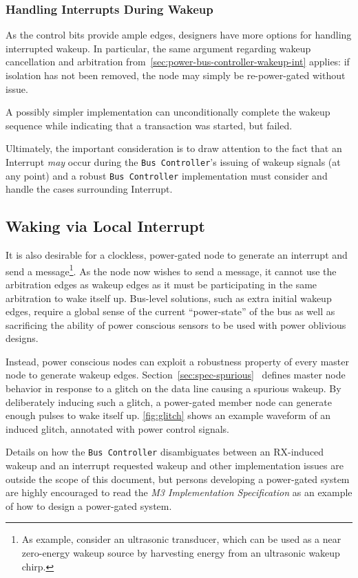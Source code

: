 \subsubsection{Handling Interrupts During Wakeup}
As the control bits provide ample edges, designers have more options for
handling interrupted wakeup. In particular, the same argument regarding wakeup
cancellation and arbitration from~\ref{sec:power-bus-controller-wakeup-int}
applies: if isolation has not been removed, the node may simply be
re-power-gated without issue.

A possibly simpler implementation can unconditionally complete the wakeup
sequence while indicating that a transaction was started, but failed.

Ultimately, the important consideration is to draw attention to the fact that
an Interrupt {\em may} occur during the {\tt Bus~Controller}'s issuing of
wakeup signals (at any point) and a robust {\tt Bus~Controller} implementation
must consider and handle the cases surrounding Interrupt.

\subsection{Waking via Local Interrupt}
It is also desirable for a clockless, power-gated \bus node to generate an
interrupt and send a message\footnote{
  As example, consider an ultrasonic transducer, which can be used as a near
  zero-energy wakeup source by harvesting energy from an ultrasonic wakeup
  chirp.}.
As the node now wishes to send a message, it cannot use the arbitration edges
as wakeup edges as it must be participating in the same arbitration to wake
itself up. Bus-level solutions, such as extra initial wakeup edges, require a
global sense of the current ``power-state'' of the bus as well as sacrificing
the ability of power conscious sensors to be used with power oblivious
designs.

Instead, power conscious nodes can exploit a robustness property of every \bus
master node to generate wakeup edges.
Section~\ref{sec:spec-spurious}~ defines master
node behavior in response to a glitch on the data line causing a spurious
wakeup. By deliberately inducing such a glitch, a power-gated member node can
generate enough pulses to wake itself up. \autoref{fig:glitch} shows an
example waveform of an induced glitch, annotated with power control signals.

Details on how the {\tt Bus~Controller} disambiguates between an RX-induced
wakeup and an interrupt requested wakeup and other implementation issues are
outside the scope of this document, but persons developing a power-gated
system are highly encouraged to read the {\em \bus M3 Implementation
Specification} as an example of how to design a power-gated system.

